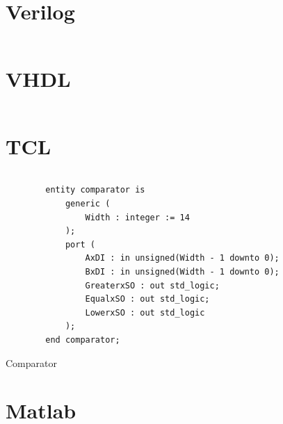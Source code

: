 \documentclass[a4paper,oneside]{alpenthesis/alpenthesis}
\begin{document}
\section{Verilog}
\begin{tcolorbox}[
        breakable,
        width=1.2\textwidth,
        title={
            \refstepcounter{listing}
            Listing \thelisting: Verilog Code
            \label{lst:makefile}
            \addcontentsline{lol}{listing}{\protect\numberline{\thelisting}Verilog Code}
        }
    ]
\inputminted{verilog}{./code/axi_axis_reader.v}
\end{tcolorbox}

\section{VHDL}
\inputminted{vhdl}{./code/comparator.vhd}

\section{TCL}
\inputminted{tcl}{./code/create_cores.tcl}

\begin{listing}
    \begin{verbatim}
        entity comparator is
            generic (
                Width : integer := 14
            );
            port (
                AxDI : in unsigned(Width - 1 downto 0);
                BxDI : in unsigned(Width - 1 downto 0);
                GreaterxSO : out std_logic;
                EqualxSO : out std_logic;
                LowerxSO : out std_logic
            );
        end comparator;
    \end{verbatim}
    \caption{Comparator}
    \label{lst:vhdl:comparator}
\end{listing}

\section{Matlab}
\begin{tcolorbox}[
        breakable,
        title={
            \refstepcounter{listing}
            Listing \thelisting: Matlab Code
            \label{lst:makefile}
            \addcontentsline{lol}{listing}{\protect\numberline{\thelisting}Matlab Code}
        }
    ]
    \inputminted[style=solarizedlight]{matlab}{./code/filterChainDesigns.m}
\end{tcolorbox}


\backmatter
\printindex
\end{document}
